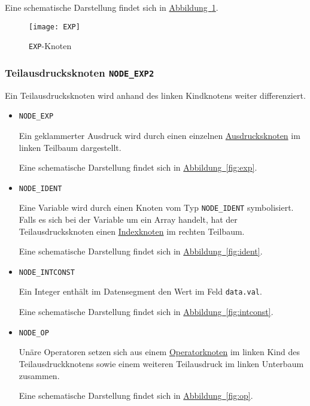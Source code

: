 Eine schematische Darstellung findet sich in \hyperref[fig:expnode]{Abbildung~\ref{fig:expnode}}.

\begin{figure}[h!]
\centering
\texttt{[image: EXP]}
\caption{\texttt{EXP}-Knoten}
\label{fig:expnode}
\end{figure}

\subsubsection{Teilausdrucksknoten \texttt{NODE\_EXP2}}
\label{sec:exp2node}
Ein Teilausdrucksknoten wird anhand des linken Kindknotens weiter differenziert.

\begin{itemize}
\item \texttt{NODE\_EXP}

Ein geklammerter Ausdruck wird durch einen einzelnen \hyperref[sec:expnode]{Ausdrucksknoten} im linken Teilbaum dargestellt.

Eine schematische Darstellung findet sich in \hyperref[fig:exp]{Abbildung~\ref{fig:exp}}.

\item \texttt{NODE\_IDENT}

Eine Variable wird durch einen Knoten vom Typ \texttt{NODE\_IDENT} symbolisiert.
Falls es sich bei der Variable um ein Array handelt,
hat der Teilausdrucksknoten einen \hyperref[sec:indexnode]{Indexknoten} im rechten Teilbaum.

Eine schematische Darstellung findet sich in \hyperref[fig:ident]{Abbildung~\ref{fig:ident}}.

\item \texttt{NODE\_INTCONST}

Ein Integer enthält im Datensegment den Wert im Feld \texttt{data.val}.

Eine schematische Darstellung findet sich in \hyperref[fig:intconst]{Abbildung~\ref{fig:intconst}}.

\item \texttt{NODE\_OP}

Unäre Operatoren setzen sich aus einem \hyperref[sec:opnode]{Operatorknoten} im linken Kind des Teilausdruckknotens sowie einem weiteren Teilausdruck im linken Unterbaum zusammen.

Eine schematische Darstellung findet sich in \hyperref[fig:op]{Abbildung~\ref{fig:op}}.

\end{itemize}

